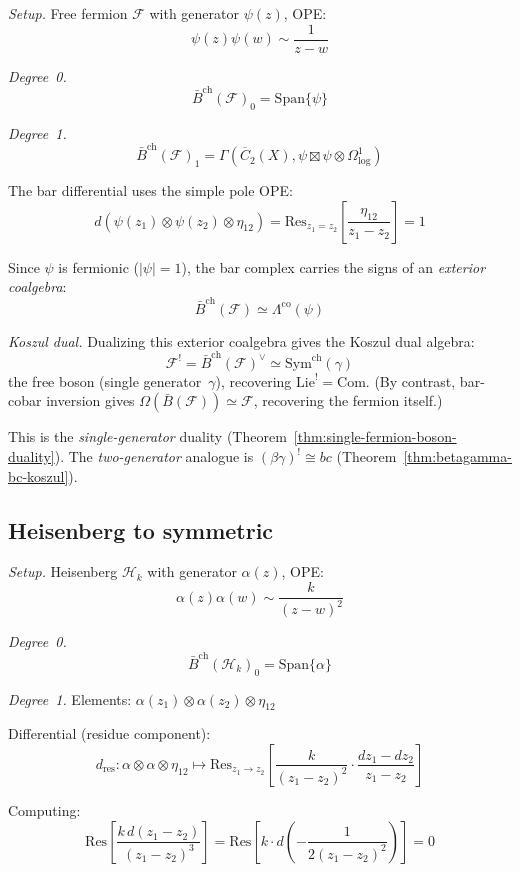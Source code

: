 \noindent\emph{Setup.} Free fermion $\mathcal{F}$ with generator $\psi(z)$, OPE:
\[\psi(z)\psi(w) \sim \frac{1}{z-w}\]

\emph{Degree~0.}
\[\bar{B}^{\text{ch}}(\mathcal{F})_0 = \text{Span}\{\psi\}\]

\emph{Degree~1.}
\[\bar{B}^{\text{ch}}(\mathcal{F})_1 = \Gamma\left(\overline{C}_2(X),
   \psi \boxtimes \psi \otimes \Omega^1_{\log}\right)\]

The bar differential uses the simple pole OPE:
\[d(\psi(z_1) \otimes \psi(z_2) \otimes \eta_{12}) = \text{Res}_{z_1 = z_2}\left[\frac{\eta_{12}}{z_1-z_2}\right] = 1\]

Since $\psi$ is fermionic ($|\psi| = 1$), the bar complex carries the signs of an \emph{exterior coalgebra}:
\[\bar{B}^{\text{ch}}(\mathcal{F}) \simeq \Lambda^{\text{co}}(\psi)\]

\emph{Koszul dual.} Dualizing this exterior coalgebra gives the Koszul dual algebra:
\[\mathcal{F}^! = \bar{B}^{\mathrm{ch}}(\mathcal{F})^\vee \simeq \mathrm{Sym}^{\mathrm{ch}}(\gamma)\]
the free boson (single generator~$\gamma$), recovering $\mathrm{Lie}^! = \mathrm{Com}$.  (By contrast, bar-cobar inversion gives $\Omega(\bar{B}(\mathcal{F})) \simeq \mathcal{F}$, recovering the fermion itself.)

This is the \emph{single-generator} duality (Theorem~\ref{thm:single-fermion-boson-duality}).  The \emph{two-generator} analogue is $(\beta\gamma)^! \cong bc$ (Theorem~\ref{thm:betagamma-bc-koszul}).

\subsection{Heisenberg to symmetric}

\noindent\emph{Setup.} Heisenberg $\mathcal{H}_k$ with generator $\alpha(z)$, OPE:
\[\alpha(z)\alpha(w) \sim \frac{k}{(z-w)^2}\]

\emph{Degree~0.}
\[\bar{B}^{\text{ch}}(\mathcal{H}_k)_0 = \text{Span}\{\alpha\}\]

\emph{Degree~1.}
Elements: $\alpha(z_1) \otimes \alpha(z_2) \otimes \eta_{12}$

Differential (residue component):
\[d_{\text{res}}: \alpha \otimes \alpha \otimes \eta_{12} \mapsto 
   \text{Res}_{z_1 \to z_2}\left[\frac{k}{(z_1-z_2)^2} \cdot \frac{dz_1-dz_2}{z_1-z_2}\right]\]

Computing:
\[\text{Res}\left[\frac{k \, d(z_1-z_2)}{(z_1-z_2)^3}\right] = 
   \text{Res}\left[k \cdot d\left(-\frac{1}{2(z_1-z_2)^2}\right)\right] = 0\]

